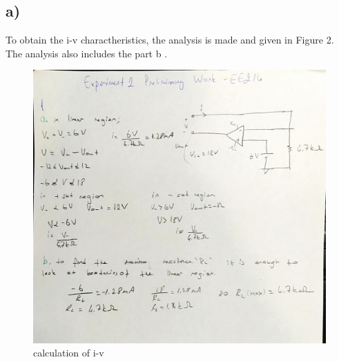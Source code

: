 \documentclass[letterpaper,12pt]{article}
\begin{document}
\subsection{a)}
To obtain the i-v charactheristics, the analysis is made and given in Figure 2. The analysis also includes the part b . 
\begin{figure}[H]
    \centering
    \includegraphics[width=1\textwidth]{1a.jpg}
\caption{ calculation of i-v }
\end{figure} 
\end{document}
